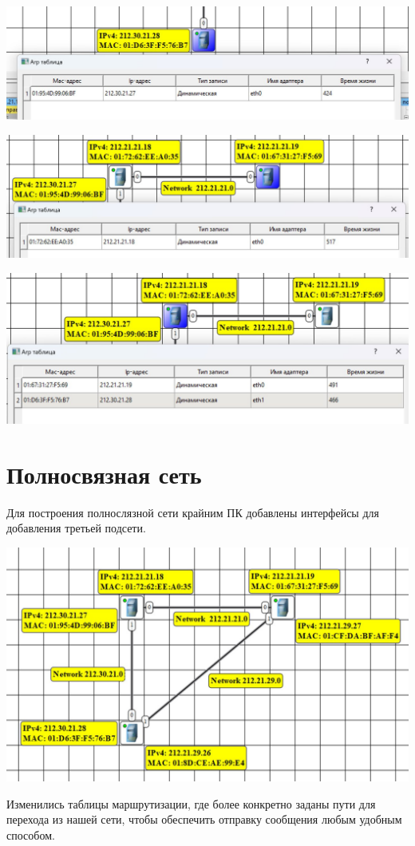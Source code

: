 \documentclass{article}
\begin{document}
\begin{minipage}{.5\textwidth}    
    \begin{center}
        \includegraphics[width=.9\textwidth]{9}
    \end{center}
\end{minipage}
\hfill
\begin{minipage}{.5\textwidth}
    \begin{center}
        \includegraphics[width=.9\textwidth]{10}
    \end{center}
\end{minipage}
\begin{center}
    \includegraphics[width=.9\textwidth]{11}
\end{center}

\section{Полносвязная сеть}
Для построения полнослязной сети крайним ПК добавлены интерфейсы для добавления третьей подсети.
\begin{center}
    \includegraphics[width=.9\textwidth]{12}
\end{center}
Изменились таблицы маршрутизации, 
где более конкретно заданы пути для перехода из нашей сети, 
чтобы обеспечить отправку сообщения любым удобным способом.
\end{document}
